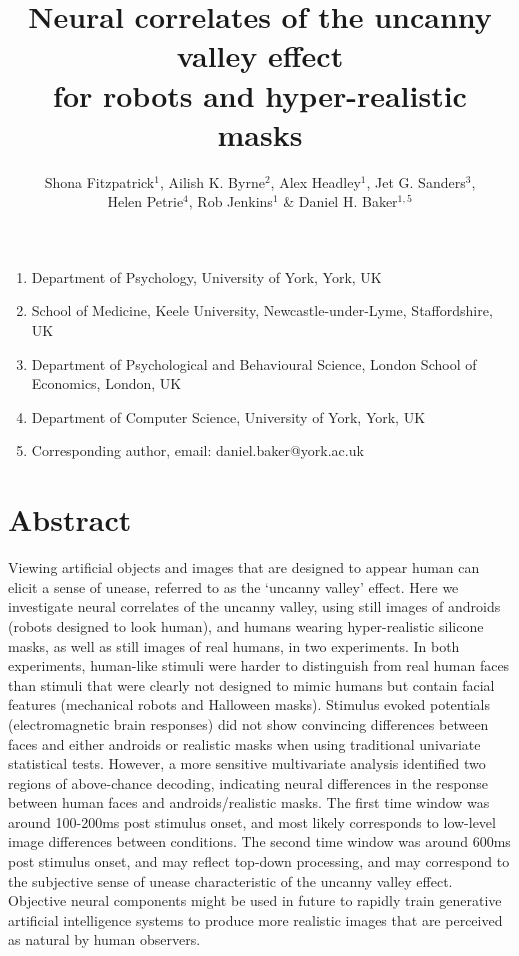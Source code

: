 \documentclass[
]{article}
\title{Neural correlates of the uncanny valley effect\\
for robots and hyper-realistic masks}
\author{Shona Fitzpatrick\(^1\), Ailish K. Byrne\(^2\), Alex Headley\(^1\), Jet G. Sanders\(^3\),\\
Helen Petrie\(^4\), Rob Jenkins\(^1\) \& Daniel H. Baker\(^{1,5}\)}
\date{}
\providecommand{\tightlist}{%
  \setlength{\itemsep}{0pt}\setlength{\parskip}{0pt}}
\begin{document}
\maketitle

\begin{enumerate}
\def\labelenumi{\arabic{enumi}.}
\tightlist
\item
  Department of Psychology, University of York, York, UK
\item
  School of Medicine, Keele University, Newcastle-under-Lyme, Staffordshire, UK
\item
  Department of Psychological and Behavioural Science, London School of Economics, London, UK
\item
  Department of Computer Science, University of York, York, UK
\item
  Corresponding author, email: daniel.baker@york.ac.uk
\end{enumerate}

\section{Abstract}\label{abstract}

Viewing artificial objects and images that are designed to appear human can elicit a sense of unease, referred to as the `uncanny valley' effect. Here we investigate neural correlates of the uncanny valley, using still images of androids (robots designed to look human), and humans wearing hyper-realistic silicone masks, as well as still images of real humans, in two experiments. In both experiments, human-like stimuli were harder to distinguish from real human faces than stimuli that were clearly not designed to mimic humans but contain facial features (mechanical robots and Halloween masks). Stimulus evoked potentials (electromagnetic brain responses) did not show convincing differences between faces and either androids or realistic masks when using traditional univariate statistical tests. However, a more sensitive multivariate analysis identified two regions of above-chance decoding, indicating neural differences in the response between human faces and androids/realistic masks. The first time window was around 100-200ms post stimulus onset, and most likely corresponds to low-level image differences between conditions. The second time window was around 600ms post stimulus onset, and may reflect top-down processing, and may correspond to the subjective sense of unease characteristic of the uncanny valley effect. Objective neural components might be used in future to rapidly train generative artificial intelligence systems to produce more realistic images that are perceived as natural by human observers.
\end{document}
